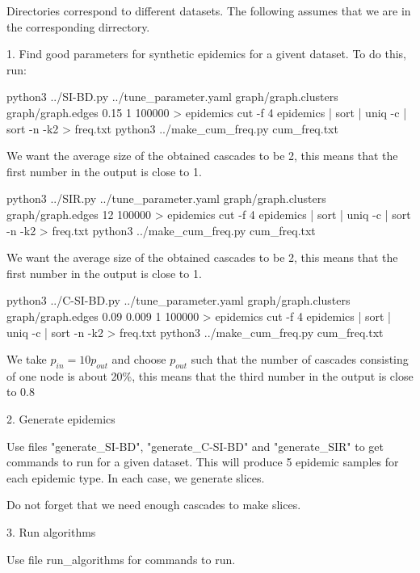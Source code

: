 Directories correspond to different datasets. The following assumes that we are in the corresponding dirrectory.

1. Find good parameters for synthetic epidemics for a givent dataset. To do this, run: 

python3 ../SI-BD.py ../tune_parameter.yaml graph/graph.clusters graph/graph.edges 0.15 1 100000 > epidemics
cut -f 4 epidemics | sort | uniq -c | sort -n -k2 > freq.txt
python3 ../make_cum_freq.py cum_freq.txt

We want the average size of the obtained cascades to be 2, this means that the first number in the output is close to 1.

python3 ../SIR.py ../tune_parameter.yaml graph/graph.clusters graph/graph.edges 12 100000 > epidemics
cut -f 4 epidemics | sort | uniq -c | sort -n -k2 > freq.txt
python3 ../make_cum_freq.py cum_freq.txt

We want the average size of the obtained cascades to be 2, this means that the first number in the output is close to 1.

python3 ../C-SI-BD.py ../tune_parameter.yaml graph/graph.clusters graph/graph.edges 0.09 0.009 1 100000 > epidemics
cut -f 4 epidemics | sort | uniq -c | sort -n -k2 > freq.txt
python3 ../make_cum_freq.py cum_freq.txt

We take $p_{in} = 10 p_{out}$ and choose $p_{out}$ such that the number of cascades consisting of one node is about 20\%, this means that the third number in the output is close to 0.8

2. Generate epidemics

Use files "generate_SI-BD", "generate_C-SI-BD" and "generate_SIR" to get commands to run for a given dataset. This will produce 5 epidemic samples for each epidemic type. In each case, we generate slices.

Do not forget that we need enough cascades to make slices.

3. Run algorithms

Use file run_algorithms for commands to run.